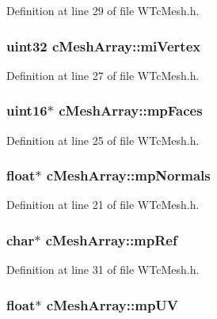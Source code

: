 Definition at line 29 of file WTcMesh.h.

\hypertarget{classc_mesh_array_a340440f28957f97372571295422880b3}{
\subsubsection[{miVertex}]{\setlength{\rightskip}{0pt plus 5cm}uint32 {\bf cMeshArray::miVertex}}}
\label{classc_mesh_array_a340440f28957f97372571295422880b3}


Definition at line 27 of file WTcMesh.h.

\hypertarget{classc_mesh_array_aab7e25f0aaf4c7afb2dd0f0384867766}{
\subsubsection[{mpFaces}]{\setlength{\rightskip}{0pt plus 5cm}uint16$\ast$ {\bf cMeshArray::mpFaces}}}
\label{classc_mesh_array_aab7e25f0aaf4c7afb2dd0f0384867766}


Definition at line 25 of file WTcMesh.h.

\hypertarget{classc_mesh_array_a1c568717706de37f77729a9292ceee42}{
\subsubsection[{mpNormals}]{\setlength{\rightskip}{0pt plus 5cm}float$\ast$ {\bf cMeshArray::mpNormals}}}
\label{classc_mesh_array_a1c568717706de37f77729a9292ceee42}


Definition at line 21 of file WTcMesh.h.

\hypertarget{classc_mesh_array_a31b40f14b026b9957f4ae44b58565061}{
\subsubsection[{mpRef}]{\setlength{\rightskip}{0pt plus 5cm}char$\ast$ {\bf cMeshArray::mpRef}}}
\label{classc_mesh_array_a31b40f14b026b9957f4ae44b58565061}


Definition at line 31 of file WTcMesh.h.

\hypertarget{classc_mesh_array_a9119e5c042443437ac22f06775662d4d}{
\subsubsection[{mpUV}]{\setlength{\rightskip}{0pt plus 5cm}float$\ast$ {\bf cMeshArray::mpUV}}}
\label{classc_mesh_array_a9119e5c042443437ac22f06775662d4d}


